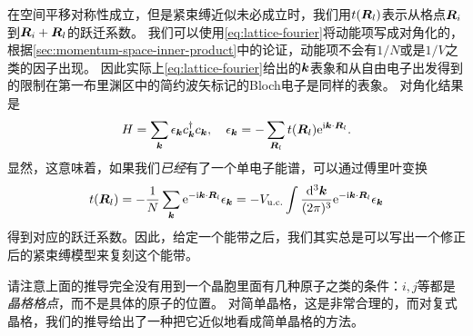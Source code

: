 在空间平移对称性成立，但是紧束缚近似未必成立时，我们用$t(\vb*{R}_l)$表示从格点$\vb*{R}_i$到$\vb*{R}_i + \vb*{R}_l$的跃迁系数。
我们可以使用\eqref{eq:lattice-fourier}将动能项写成对角化的，根据\autoref{sec:momentum-space-inner-product}中的论证，动能项不会有$1/N$或是$1/V$之类的因子出现。
因此实际上\eqref{eq:lattice-fourier}给出的$\vb*{k}$表象和从自由电子出发得到的限制在第一布里渊区中的简约波矢标记的Bloch电子是同样的表象。
对角化结果是
\begin{equation}
    H = \sum_{\vb*{k}} \epsilon_{\vb*{k}} c^\dagger_{\vb*{k}} c_{\vb*{k}}, \quad \epsilon_{\vb*{k}} = - \sum_{\vb*{R}_l} t(\vb*{R}_l) \mathrm{e}^{\mathrm{i} \vb*{k} \cdot \vb*{R}_l} .
\end{equation}
显然，这意味着，如果我们\emph{已经}有了一个单电子能谱，可以通过傅里叶变换
\begin{equation}
    t(\vb*{R}_l) = - \frac{1}{N} \sum_{\vb*{k}} \mathrm{e}^{- \mathrm{i} \vb*{k} \cdot \vb*{R}_l} \epsilon_{\vb*{k}} = - V_\text{u.c.} \int \frac{\dd[3]{\vb*{k}}}{(2\pi)^3} \mathrm{e}^{- \mathrm{i} \vb*{k} \cdot \vb*{R}_l} \epsilon_{\vb*{k}}
\end{equation}
得到对应的跃迁系数。因此，给定一个能带之后，我们其实总是可以写出一个修正后的紧束缚模型来复刻这个能带。

请注意上面的推导完全没有用到一个晶胞里面有几种原子之类的条件：$i, j$等都是\emph{晶格格点}，而不是具体的原子的位置。
对简单晶格，这是非常合理的，而对复式晶格，我们的推导给出了一种把它近似地看成简单晶格的方法。

